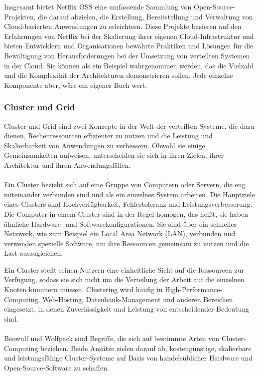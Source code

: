 Insgesamt bietet Netflix OSS eine umfassende Sammlung von Open-Source-Projekten, die darauf abzielen, die Erstellung, Bereitstellung und Verwaltung von Cloud-basierten Anwendungen zu erleichtern. Diese Projekte basieren auf den Erfahrungen von Netflix bei der Skalierung ihrer eigenen Cloud-Infrastruktur und bieten Entwicklern und Organisationen bewährte Praktiken und Lösungen für die Bewältigung von Herausforderungen bei der Umsetzung von verteilten Systemen in der Cloud. Sie können als ein Beispiel wahrgenommen werden, das die Vielzahl und die Komplexität der Architekturen demonstrieren sollen. Jede einzelne Komponente aber, wäre ein eigenes Buch wert. 

\subsubsection{Cluster und Grid}

Cluster und Grid sind zwei Konzepte in der Welt der verteilten Systeme, die dazu dienen, Rechenressourcen effizienter zu nutzen und die Leistung und Skalierbarkeit von Anwendungen zu verbessern. Obwohl sie einige Gemeinsamkeiten aufweisen, unterscheiden sie sich in ihren Zielen, ihrer Architektur und ihren Anwendungsfällen.
\\\\
Ein Cluster bezieht sich auf eine Gruppe von Computern oder Servern, die eng miteinander verbunden sind und als ein einzelnes System arbeiten. Die Hauptziele eines Clusters sind Hochverfügbarkeit, Fehlertoleranz und Leistungsverbesserung. Die Computer in einem Cluster sind in der Regel homogen, das heißt, sie haben ähnliche Hardware- und Softwarekonfigurationen. Sie sind über ein schnelles Netzwerk, wie zum Beispiel ein Local Area Network (LAN), verbunden und verwenden spezielle Software, um ihre Ressourcen gemeinsam zu nutzen und die Last auszugleichen.

Ein Cluster stellt seinen Nutzern eine einheitliche Sicht auf die Ressourcen zur Verfügung, sodass sie sich nicht um die Verteilung der Arbeit auf die einzelnen Knoten kümmern müssen. Clustering wird häufig in High-Performance-Computing, Web-Hosting, Datenbank-Management und anderen Bereichen eingesetzt, in denen Zuverlässigkeit und Leistung von entscheidender Bedeutung sind.
\\\\
Beowulf und Wolfpack sind Begriffe, die sich auf bestimmte Arten von Cluster-Computing beziehen. Beide Ansätze zielen darauf ab, kostengünstige, skalierbare und leistungsfähige Cluster-Systeme auf Basis von handelsüblicher Hardware und Open-Source-Software zu schaffen.

